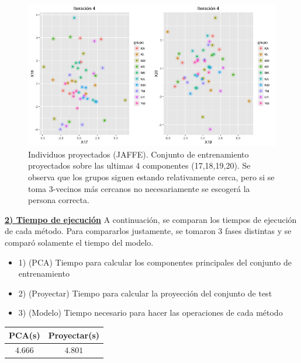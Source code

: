\begin{figure}[!ht]
  \centering
  \includegraphics[width=.95\textwidth]{Figures/Chapter4_ultimasComponentes_JAF.png} 
  \caption[Individuos proyectados (JAFFE).]
  {Individuos proyectados (JAFFE). Conjunto de entrenamiento proyectados sobre las ultimas 4 componentes (17,18,19,20). Se observa que los grupos siguen estando relativamente cerca, pero si se toma 3-vecinos más cercanos no necesariamente se escogerá la persona correcta.}
\end{figure}


\underline{\textbf{2) Tiempo de ejecución}}
A continuación, se comparan los tiempos de ejecución de cada método. Para compararlos justamente, se tomaron 3 fases distintas y se comparó solamente el tiempo del modelo.

\begin{itemize}
\item 1) (PCA) Tiempo para calcular los componentes principales del conjunto de entrenamiento
\item 2) (Proyectar) Tiempo para calcular la proyección del conjunto de test
\item 3) (Modelo) Tiempo necesario para hacer las operaciones de cada método

\end{itemize}

\begin{center}
\begin{tabular}{ | c | c |} 
\hline
 PCA(s) & Proyectar(s) \\ 
\hline
\hline
$4.666$ & $4.801$ \\ 
\hline
\hline
\end{tabular}
\end{center}


